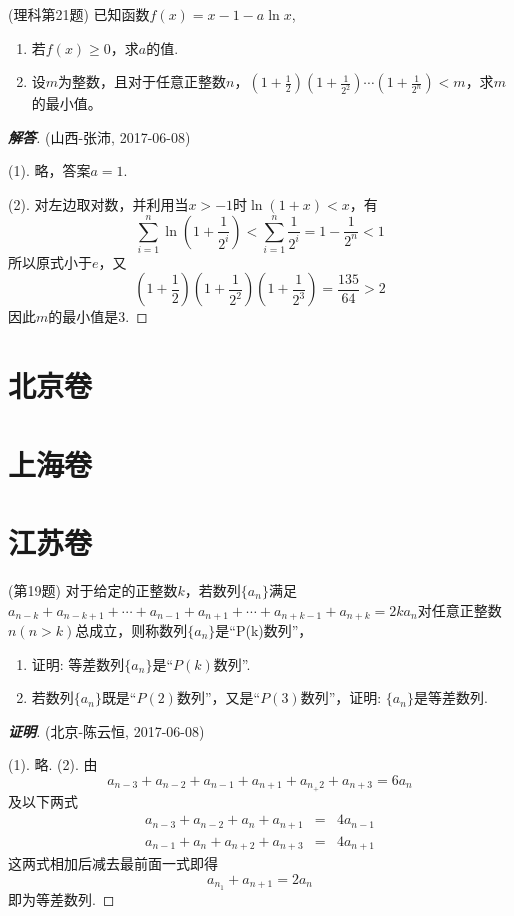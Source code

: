 \documentclass{ctexart}
\begin{document}
\begin{exercise}(理科第21题)
  已知函数$f(x)=x-1-a\ln{x}$,
  \begin{enumerate}
  \item 若$f(x) \geqslant 0$，求$a$的值.
  \item 设$m$为整数，且对于任意正整数$n$，$\left( 1+\frac{1}{2} \right)\left( 1+\frac{1}{2^2} \right) \cdots \left( 1+\frac{1}{2^n} \right) <m$，求$m$的最小值。
  \end{enumerate}
\end{exercise}

\begin{proof}[\textbf{解答}](山西-张沛, 2017-06-08)

  (1). 略，答案$a=1$.

  (2). 对左边取对数，并利用当$x>-1$时$\ln{(1+x)}<x$，有
  \[ \sum_{i=1}^n \ln{\left( 1+\frac{1}{2^i} \right)} < \sum_{i=1}^n \frac{1}{2^i} = 1-\frac{1}{2^n} < 1 \]
  所以原式小于$e$，又
  \[ \left( 1+\frac{1}{2} \right)\left( 1+\frac{1}{2^2} \right)\left( 1+\frac{1}{2^3} \right) = \frac{135}{64}>2 \]
  因此$m$的最小值是3.
\end{proof}

\section{北京卷}
\label{sec:beijing}

\section{上海卷}
\label{sec:shanghai}

\section{江苏卷}
\label{sec:jiangshu}

\begin{exercise}(第19题)
  对于给定的正整数$k$，若数列$\{a_n\}$满足$a_{n-k}+a_{n-k+1}+\cdots+a_{n-1}+a_{n+1}+\cdots+a_{n+k-1}+a_{n+k}=2ka_n$对任意正整数$n(n>k)$总成立，则称数列$\{a_n\}$是“P(k)数列”，
  \begin{enumerate}
  \item 证明: 等差数列$\{a_n\}$是“$P(k)$数列”.
  \item 若数列$\{a_n\}$既是“$P(2)$数列”，又是“$P(3)$数列”，证明: $\{a_n\}$是等差数列.
  \end{enumerate}
\end{exercise}

\begin{proof}[\textbf{证明}] (北京-陈云恒, 2017-06-08)

  (1). 略.
  (2). 由
  \[ a_{n-3}+a_{n-2}+a_{n-1}+a_{n+1}+a_{n_+2}+a_{n+3}=6a_n \]
  及以下两式
  \begin{eqnarray*}
    a_{n-3}+a_{n-2}+a_n+a_{n+1} & = &4a_{n-1} \\
    a_{n-1}+a_n+a_{n+2}+a_{n+3} & = &4a_{n+1} 
  \end{eqnarray*}
  这两式相加后减去最前面一式即得
  \[ a_{n_1}+a_{n+1}=2a_n \]
  即为等差数列.
\end{proof}
\end{document}
